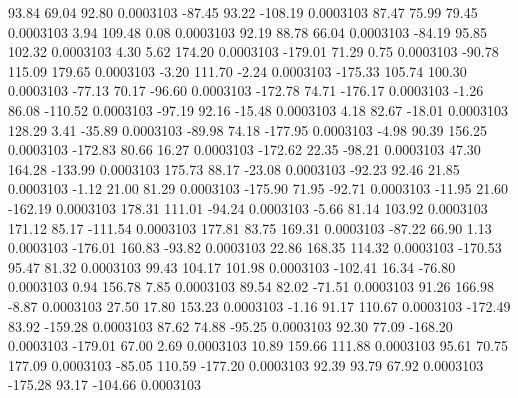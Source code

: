        93.84       69.04       92.80     0.0003103
      -87.45       93.22     -108.19     0.0003103
       87.47       75.99       79.45     0.0003103
        3.94      109.48        0.08     0.0003103
       92.19       88.78       66.04     0.0003103
      -84.19       95.85      102.32     0.0003103
        4.30        5.62      174.20     0.0003103
     -179.01       71.29        0.75     0.0003103
      -90.78      115.09      179.65     0.0003103
       -3.20      111.70       -2.24     0.0003103
     -175.33      105.74      100.30     0.0003103
      -77.13       70.17      -96.60     0.0003103
     -172.78       74.71     -176.17     0.0003103
       -1.26       86.08     -110.52     0.0003103
      -97.19       92.16      -15.48     0.0003103
        4.18       82.67      -18.01     0.0003103
      128.29        3.41      -35.89     0.0003103
      -89.98       74.18     -177.95     0.0003103
       -4.98       90.39      156.25     0.0003103
     -172.83       80.66       16.27     0.0003103
     -172.62       22.35      -98.21     0.0003103
       47.30      164.28     -133.99     0.0003103
      175.73       88.17      -23.08     0.0003103
      -92.23       92.46       21.85     0.0003103
       -1.12       21.00       81.29     0.0003103
     -175.90       71.95      -92.71     0.0003103
      -11.95       21.60     -162.19     0.0003103
      178.31      111.01      -94.24     0.0003103
       -5.66       81.14      103.92     0.0003103
      171.12       85.17     -111.54     0.0003103
      177.81       83.75      169.31     0.0003103
      -87.22       66.90        1.13     0.0003103
     -176.01      160.83      -93.82     0.0003103
       22.86      168.35      114.32     0.0003103
     -170.53       95.47       81.32     0.0003103
       99.43      104.17      101.98     0.0003103
     -102.41       16.34      -76.80     0.0003103
        0.94      156.78        7.85     0.0003103
       89.54       82.02      -71.51     0.0003103
       91.26      166.98       -8.87     0.0003103
       27.50       17.80      153.23     0.0003103
       -1.16       91.17      110.67     0.0003103
     -172.49       83.92     -159.28     0.0003103
       87.62       74.88      -95.25     0.0003103
       92.30       77.09     -168.20     0.0003103
     -179.01       67.00        2.69     0.0003103
       10.89      159.66      111.88     0.0003103
       95.61       70.75      177.09     0.0003103
      -85.05      110.59     -177.20     0.0003103
       92.39       93.79       67.92     0.0003103
     -175.28       93.17     -104.66     0.0003103
